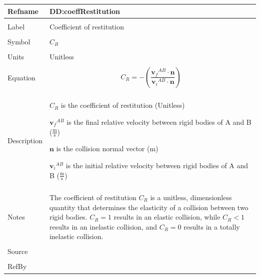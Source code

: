 \documentclass[12pt]{article}
\begin{document}
\noindent \begin{minipage}{\textwidth}
\begin{tabular}{p{} p{}}
\toprule \textbf{Refname} & \textbf{DD:coeffRestitution}
\label{DD:coeffRestitution}
\\ \midrule \\
Label & Coefficient of restitution
        \\ \midrule \\
        Symbol & ${C_{R}}$
                 \\ \midrule \\
                 Units & Unitless
                         \\ \midrule \\
                         Equation & \begin{displaymath}
                                    {C_{R}}=-\left(\frac{{{\mathbf{v}_{f}}^{AB}}\cdot{}\mathbf{n}}{{{\mathbf{v}_{i}}^{AB}}\cdot{}\mathbf{n}}\right)
                                    \end{displaymath}
                                    \\ \midrule \\
                                    Description & \begin{symbDescription}
                                                  \item{${C_{R}}$ is the coefficient of restitution (Unitless)}
                                                  \item{${{\mathbf{v}_{f}}^{AB}}$ is the final relative velocity between rigid bodies of A and B ($\frac{\text{m}}{\text{s}}$)}
                                                  \item{$\mathbf{n}$ is the collision normal vector (m)}
                                                  \item{${{\mathbf{v}_{i}}^{AB}}$ is the initial relative velocity between rigid bodies of A and B ($\frac{\text{m}}{\text{s}}$)}
                                                  \end{symbDescription}
                                                  \\ \midrule \\
                                                  Notes & The coefficient of restitution ${C_{R}}$ is a unitless, dimensionless quantity that determines the elasticity of a collision between two rigid bodies. ${C_{R}}=1$ results in an elastic collision, while ${C_{R}}<1$ results in an inelastic collision, and ${C_{R}}=0$ results in a totally inelastic collision.
                                                          \\ \midrule \\
                                                          Source & \\ \midrule \\
                                                                   RefBy & 
\\ \bottomrule \end{tabular}
\end{minipage}
\par~
\end{document}
